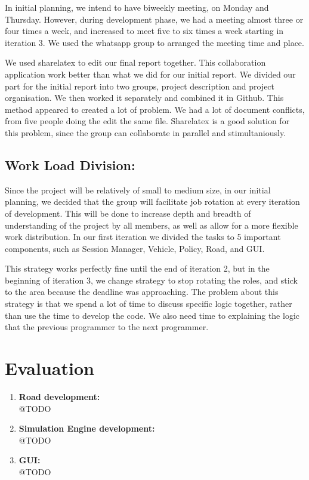 \documentclass[11pt]{article}
\begin{document}
In initial planning, we intend to have biweekly meeting, on Monday and Thursday. However, during development phase, we had a meeting almost three or four times a week, and increased to meet five to six times a week starting in iteration 3. We used the whatsapp group to arranged the meeting time and place. 

We used sharelatex to edit our final report together. This collaboration application work better than what we did for our initial report. We divided our part for the initial report into two groups, project description and project organisation. We then worked it separately and combined it in Github. This method appeared to created a lot of problem. We had a lot of document conflicts, from five people doing the edit the same file. Sharelatex is a good solution for this problem, since the group can collaborate in parallel and stimultaniously. 

\subsection{Work Load Division:}
Since the project will be relatively of small to medium size, in our initial planning, we decided that the group will facilitate job rotation at every iteration of development. This will be done to increase depth and breadth of understanding of the project by all members, as well as allow for a more flexible work distribution. In our first iteration we divided the tasks to 5 important components, such as Session Manager, Vehicle, Policy, Road, and GUI.

This strategy works perfectly fine until the end of iteration 2, but in the beginning of iteration 3, we change strategy to stop rotating the roles, and stick to the area because the deadline was approaching. The problem about this strategy is that we spend a lot of time to discuss specific logic together, rather than use the time to develop the code. We also need time to explaining the logic that the previous programmer to the next programmer. 

	
\section{Evaluation} %
\begin{enumerate}
	\item \textbf{Road development:} 
	\\@TODO
	\item \textbf{Simulation Engine development:} 
	\\@TODO
	\item \textbf{GUI:} 
	\\@TODO
\end{enumerate}
\end{document}
